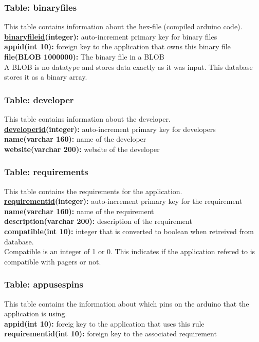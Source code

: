 		\subsubsection{Table: binaryfiles}

			This table contains information about the hex-file (compiled arduino code). \\
			{\bf \underline{binaryfileid}(integer):} auto-increment primary key for binary files \\
			\textbf{appid(int 10):} foreign key to the application that owns this binary file \\
			\textbf{file(BLOB 1000000):} The binary file in a BLOB \\

			A BLOB is no datatype and stores data exactly as it was input. This database stores it as a binary array.

		\subsubsection{Table: developer}

			This table contains information about the developer. \\
			{\bf \underline{developerid}(integer):} auto-increment primary key for developers \\
			\textbf{name(varchar 160):} name of the developer \\
			\textbf{website(varchar 200):} website of the developer \\

		\subsubsection{Table: requirements}

			This table contains the requirements for the application. \\
			{\bf \underline{requirementid}(integer):} auto-increment primary key for the requirement \\
			\textbf{name(varchar 160):} name of the requirement \\
			\textbf{description(varchar 200):} description of the requirement \\
			\textbf{compatible(int 10):} integer that is converted to boolean when retreived from database. \\

			Compatible is an integer of 1 or 0. This indicates if the application refered to is compatible with pagers or not.

		\subsubsection{Table: appusespins}

			This table contains the information about which pins on the arduino that the application is using. \\
			\textbf{appid(int 10):} foreig key to the application that uses this rule \\
			\textbf{requirementid(int 10):} foreign key to the associated requirement \\

